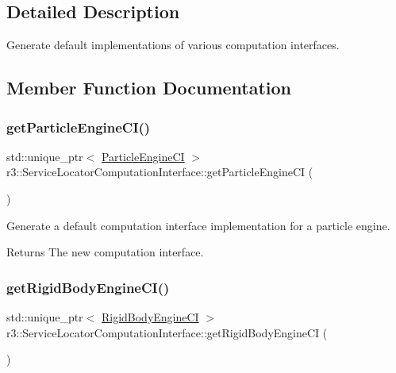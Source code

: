 \subsection{Detailed Description}
Generate default implementations of various computation interfaces. 

\subsection{Member Function Documentation}
\mbox{\label{classr3_1_1_service_locator_computation_interface_abc0c31a51308c4db9932763325c0cb08}} 
\subsubsection{\texorpdfstring{get\+Particle\+Engine\+C\+I()}{getParticleEngineCI()}}
{\footnotesize\ttfamily std\+::unique\+\_\+ptr$<$ \mbox{\hyperlink{classr3_1_1_particle_engine_c_i}{Particle\+Engine\+CI}} $>$ r3\+::\+Service\+Locator\+Computation\+Interface\+::get\+Particle\+Engine\+CI (\begin{DoxyParamCaption}{ }\end{DoxyParamCaption})\hspace{0.3cm}{\ttfamily [static]}}



Generate a default computation interface implementation for a particle engine. 

\begin{DoxyReturn}{Returns}
The new computation interface. 
\end{DoxyReturn}
\mbox{\label{classr3_1_1_service_locator_computation_interface_a01d7434be386277d9a9a26d6859472c3}} 
\subsubsection{\texorpdfstring{get\+Rigid\+Body\+Engine\+C\+I()}{getRigidBodyEngineCI()}}
{\footnotesize\ttfamily std\+::unique\+\_\+ptr$<$ \mbox{\hyperlink{classr3_1_1_rigid_body_engine_c_i}{Rigid\+Body\+Engine\+CI}} $>$ r3\+::\+Service\+Locator\+Computation\+Interface\+::get\+Rigid\+Body\+Engine\+CI (\begin{DoxyParamCaption}{ }\end{DoxyParamCaption})\hspace{0.3cm}{\ttfamily [static]}}



